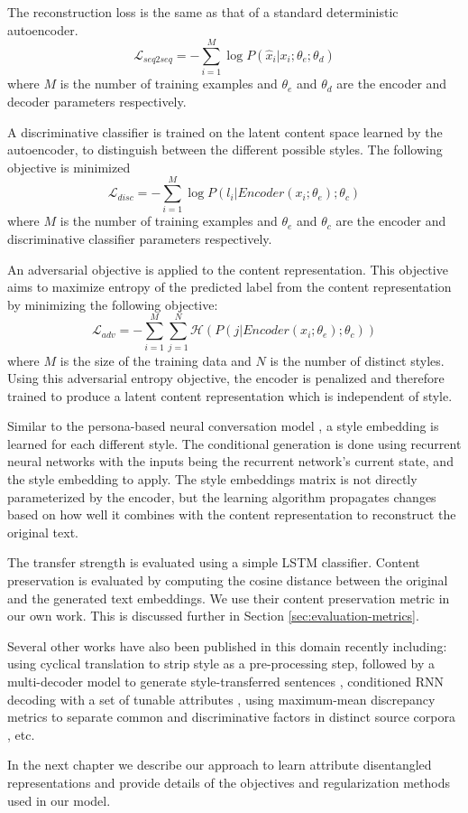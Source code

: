 The reconstruction loss is the same as that of a standard deterministic autoencoder.
\begin{equation}
	\mathcal{L}_{seq2seq} = -\sum_{i=1}^M \log P(\hat{x}_i|x_i;\theta_e;\theta_d)
\end{equation}
where $M$ is the number of training examples and $\theta_e$ and $\theta_d$ are the encoder and decoder parameters respectively.

A discriminative classifier is trained on the latent content space learned by the autoencoder, to distinguish between the different possible styles. The following objective is minimized
\begin{equation}
	\mathcal{L}_{disc} = -\sum_{i=1}^M \log P(l_i|Encoder(x_i;\theta_e);\theta_c)
\end{equation}
where $M$ is the number of training examples and $\theta_e$ and $\theta_c$ are the encoder and discriminative classifier parameters respectively.

An adversarial objective is applied to the content representation. This objective aims to maximize entropy of the predicted label from the content representation by minimizing the following objective:
\begin{equation}
	\mathcal{L}_{adv} = -\sum_{i=1}^M\sum_{j=1}^N \mathcal{H}(P(j|Encoder(x_i; \theta_e); \theta_c))
\end{equation}
where $M$ is the size of the training data and $N$ is the number of distinct styles. Using this adversarial entropy objective, the encoder is penalized and therefore trained to produce a latent content representation which is independent of style.

Similar to the persona-based neural conversation model \citep{li2016persona}, a style embedding is learned for each different style. The conditional generation is done using recurrent neural networks with the inputs being the recurrent network's current state, and the style embedding to apply. The style embeddings matrix is not directly parameterized by the encoder, but the learning algorithm propagates changes based on how well it combines with the content representation to reconstruct the original text.

The transfer strength is evaluated using a simple LSTM classifier. Content preservation is evaluated by computing the cosine distance between the original and the generated text embeddings. We use their content preservation metric in our own work. This is discussed further in Section \ref{sec:evaluation-metrics}.


Several other works have also been published in this domain recently including: using cyclical translation to strip style as a pre-processing step, followed by a multi-decoder model to generate style-transferred sentences \citep{prabhumoye2018style}, conditioned RNN decoding with a set of tunable attributes \citep{ficler2017controlling}, using maximum-mean discrepancy metrics to separate common and discriminative factors in distinct source corpora \citep{larsson2017disentangled}, etc.



In the next chapter we describe our approach to learn attribute disentangled representations and provide details of the objectives and regularization methods used in our model.
